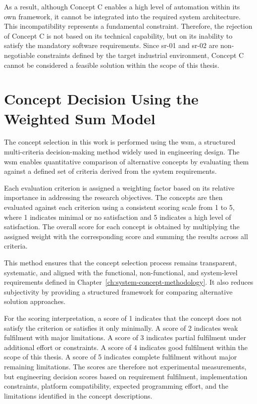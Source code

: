 As a result, although Concept C enables a high level of automation within its own framework, it cannot be integrated into the required system architecture. This incompatibility represents a fundamental constraint. Therefore, the rejection of Concept C is not based on its technical capability, but on its inability to satisfy the mandatory software requirements. Since \acs{sr}-01 and \acs{sr}-02 are non-negotiable constraints defined by the target industrial environment, Concept C cannot be considered a feasible solution within the scope of this thesis.



\section{Concept Decision Using the Weighted Sum Model}
\label{sec:concept-decision-wsm}
\label{sec:wsm-methodology}

The concept selection in this work is performed using the \ac{wsm}, a structured multi-criteria decision-making method widely used in engineering design. The \ac{wsm} enables quantitative comparison of alternative concepts by evaluating them against a defined set of criteria derived from the system requirements.

Each evaluation criterion is assigned a weighting factor based on its relative importance in addressing the research objectives. The concepts are then evaluated against each criterion using a consistent scoring scale from 1 to 5, where 1 indicates minimal or no satisfaction and 5 indicates a high level of satisfaction. The overall score for each concept is obtained by multiplying the assigned weight with the corresponding score and summing the results across all criteria.

This method ensures that the concept selection process remains transparent, systematic, and aligned with the functional, non-functional, and system-level requirements defined in Chapter~\ref{ch:system-concept-methodology}. It also reduces subjectivity by providing a structured framework for comparing alternative solution approaches.

For the scoring interpretation, a score of 1 indicates that the concept does not satisfy the criterion or satisfies it only minimally. A score of 2 indicates weak fulfilment with major limitations. A score of 3 indicates partial fulfilment under additional effort or constraints. A score of 4 indicates good fulfilment within the scope of this thesis. A score of 5 indicates complete fulfilment without major remaining limitations. The scores are therefore not experimental measurements, but engineering decision scores based on requirement fulfilment, implementation constraints, platform compatibility, expected programming effort, and the limitations identified in the concept descriptions.


